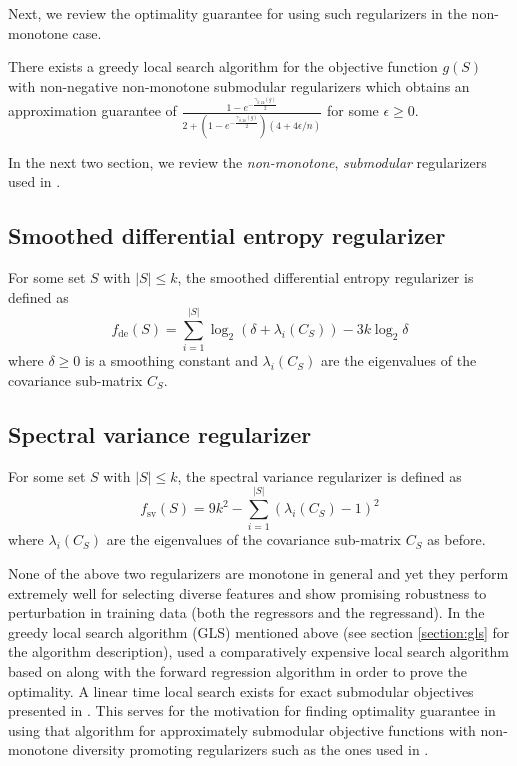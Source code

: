 \noindent Next, we review the optimality guarantee for using such regularizers in the non-monotone case. 

\begin{theorem}
 There exists a greedy local search algorithm for the objective function $g(S)$ with non-negative non-monotone submodular regularizers which obtains an approximation guarantee of $\frac{1-e^{-\frac{\gamma_{\hat{S},2k}(g)}{2}}}{2+(1-e^{-\frac{\gamma_{\hat{S},2k}(g)}{2}})(4+4\epsilon/n)}$ for some $\epsilon\ge 0$.
\end{theorem}

\noindent In the next two section, we review the \emph{non-monotone}, \emph{submodular} regularizers used in \citealp{NIPS2012_4689}.

\subsection{Smoothed differential entropy regularizer}
For some set $S$ with $|S|\le k$, the smoothed differential entropy regularizer is defined as
\[f_{\text{de}}(S)=\sum_{i=1}^{|S|} \log_2(\delta + \lambda_i(C_S))-3k \log_2 \delta\]
where $\delta\ge 0$ is a smoothing constant and $\lambda_i(C_S)$ are the eigenvalues of the covariance sub-matrix $C_S$. 

\subsection{Spectral variance regularizer}
For some set $S$ with $|S|\le k$, the spectral variance regularizer is defined as
\[f_{\text{sv}}(S)=9k^2-\sum_{i=1}^{|S|} (\lambda_i(C_S)-1)^2\]
where $\lambda_i(C_S)$ are the eigenvalues of the covariance sub-matrix $C_S$ as before.

None of the above two regularizers are monotone in general and yet they perform extremely well for selecting diverse features and show promising robustness to perturbation in training data (both the regressors and the regressand). In the greedy local search algorithm (GLS) mentioned above (see section \ref{section:gls} for the algorithm description), \citealp{NIPS2012_4689} used a comparatively expensive local search algorithm based on \citealp{Feige:2011:MNS:2079073.2079078} along with the forward regression algorithm in order to prove the optimality. A linear time local search exists for exact submodular objectives presented in \citealp{Buchbinder:2012:TLT:2417500.2417835}. This serves for the motivation for finding optimality guarantee in using that algorithm for approximately submodular objective functions with non-monotone diversity promoting regularizers such as the ones used in \citealp{NIPS2012_4689}.